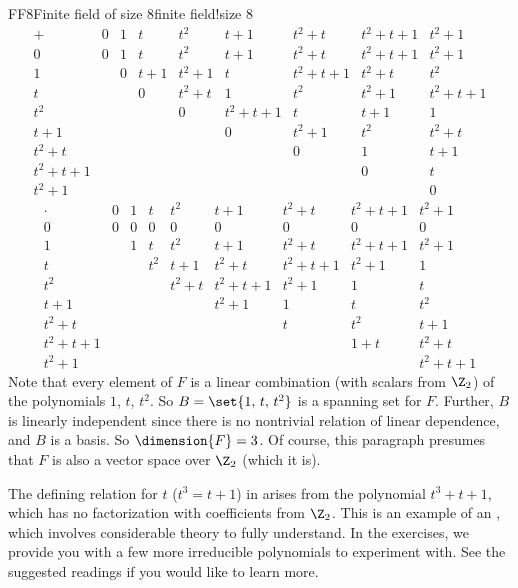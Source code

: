 \begin{example}{FF8}{Finite field of size 8}{finite field!size 8}
%
$$
\begin{array}{l|llllllll}
+ & 0 & 1 & t & t^2 & t+1 & t^2+t & t^2+t+1 & t^2+1 \\\hline
0      & 0 & 1 & t & t^2 & t+1 & t^2+t & t^2+t+1 & t^2+1 \\
1      &    & 0 & t+1 & t^2+1 & t & t^2+t+1 & t^2+t & t^2 \\
 t      &    &     & 0 & t^2+t & 1 & t^2 & t^2+1 & t^2+t+1 \\
 t^2 &      &       &        & 0 & t^2+t+1 & t & t+1 & 1 \\
 t+1 &      &       &        &    & 0 & t^2+1 & t^2 & t^2+t \\
 t^2+t&   &       &       &     &    & 0 & 1 & t+1 \\
 t^2+t+1&&       &       &     &    &    &  0 & t \\
 t^2+1&   &      &        &    &     &        &    & 0
\end{array}
$$
%
$$
\begin{array}{l|llllllll}
\cdot & 0 & 1 & t & t^2 & t+1 & t^2+t & t^2+t+1 & t^2+1 \\\hline
0 & 0 & 0 & 0 & 0 & 0 & 0 & 0 & 0 \\
 1 &   & 1 & t & t^2 & t+1 & t^2+t & t^2+t+1 & t^2+1 \\
 t &    &    & t^2 & t+1 & t^2+t & t^2+t+1 & t^2+1 & 1 \\
 t^2 & &    &      & t^2+t & t^2+t+1 & t^2+1 & 1 & t \\
 t+1 &   &  &      &           & t^2+1 & 1 & t & t^2 \\
 t^2+t &  &  &    &           &           & t & t^2 & t+1 \\
 t^2+t+1&& &  &  &          &           & 1+t & t^2+t \\
 t^2+1 &   &  &  &  &          &           &    & t^2+t+1
\end{array}
$$
%
Note that every element of $F$ is a linear combination (with scalars from $\Z_2$) of the polynomials $1$, $t$, $t^2$.  So $B=\set{1,\,t,\,t^2}$ is a spanning set for $F$.  Further, $B$ is linearly independent since there is no nontrivial relation of linear dependence, and $B$ is a basis.  So $\dimension{F}=3$.  Of course, this paragraph presumes that $F$ is also a vector space over $\Z_2$ (which it is).
%
\end{example}
%
The defining relation for $t$ ($t^3=t+1$) in    arises from the polynomial $t^3+t+1$, which has no factorization with coefficients from $\Z_2$.  This is an example of an , which involves considerable theory to fully understand.  In the exercises, we provide you with a few more irreducible polynomials to experiment with.  See the suggested readings if you would like to learn more.\par
